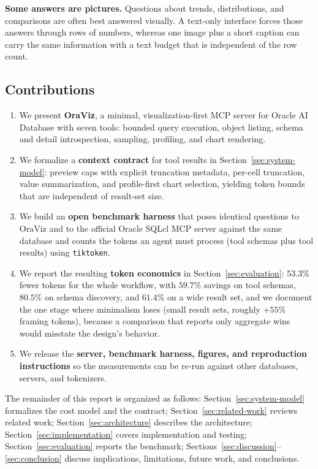 \textbf{Some answers are pictures.} Questions about trends, distributions, and comparisons are often best answered visually. A text-only interface forces those answers through rows of numbers, whereas one image plus a short caption can carry the same information with a text budget that is independent of the row count.

\subsection{Contributions}

\begin{enumerate}
  \item We present \textbf{OraViz}, a minimal, visualization-first MCP server for Oracle AI Database with seven tools: bounded query execution, object listing, schema and detail introspection, sampling, profiling, and chart rendering.
  \item We formalize a \textbf{context contract} for tool results in Section~\ref{sec:system-model}: preview caps with explicit truncation metadata, per-cell truncation, value summarization, and profile-first chart selection, yielding token bounds that are independent of result-set size.
  \item We build an \textbf{open benchmark harness} that poses identical questions to OraViz and to the official Oracle SQLcl MCP server against the same database and counts the tokens an agent must process (tool schemas plus tool results) using \texttt{tiktoken}.
  \item We report the resulting \textbf{token economics} in Section~\ref{sec:evaluation}: $53.3$\% fewer tokens for the whole workflow, with $59.7$\% savings on tool schemas, $80.5$\% on schema discovery, and $61.4$\% on a wide result set, and we document the one stage where minimalism loses (small result sets, roughly $+55$\% framing tokens), because a comparison that reports only aggregate wins would misstate the design's behavior.
  \item We release the \textbf{server, benchmark harness, figures, and reproduction instructions} so the measurements can be re-run against other databases, servers, and tokenizers.
\end{enumerate}

The remainder of this report is organized as follows: Section~\ref{sec:system-model} formalizes the cost model and the contract; Section~\ref{sec:related-work} reviews related work; Section~\ref{sec:architecture} describes the architecture; Section~\ref{sec:implementation} covers implementation and testing; Section~\ref{sec:evaluation} reports the benchmark; Sections~\ref{sec:discussion}--\ref{sec:conclusion} discuss implications, limitations, future work, and conclusions.
